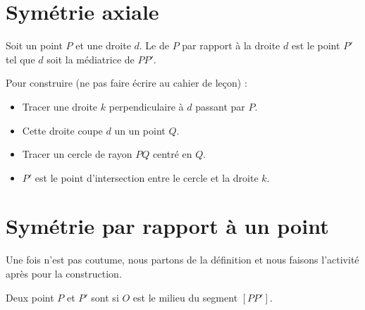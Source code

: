 


\section{Symétrie axiale}

\begin{definition}
    Soit un point \( P\) et une droite \( d\). Le  de \( P\) par rapport à la droite \( d\) est le point \( P'\) tel que \( d\) soit la médiatrice de \( PP'\).
\end{definition}

Pour construire (ne pas faire écrire au cahier de leçon) :
\begin{itemize}
    \item Tracer une droite \( k\) perpendiculaire à \( d\) passant par \( P\).
    \item Cette droite coupe \( d\) un un point \( Q\).
    \item Tracer un cercle de rayon \( PQ\) centré en \( Q\).
    \item \( P'\) est le point d'intersection entre le cercle et la droite \( k\).
\end{itemize}

\section{Symétrie par rapport à un point}

Une fois n'est pas coutume, nous partons de la définition et nous faisons l'activité après pour la construction.
\begin{definition}
    Deux point \( P\) et \( P'\) sont  si \( O\) est le milieu du segment \( [PP']\). 
\end{definition}




